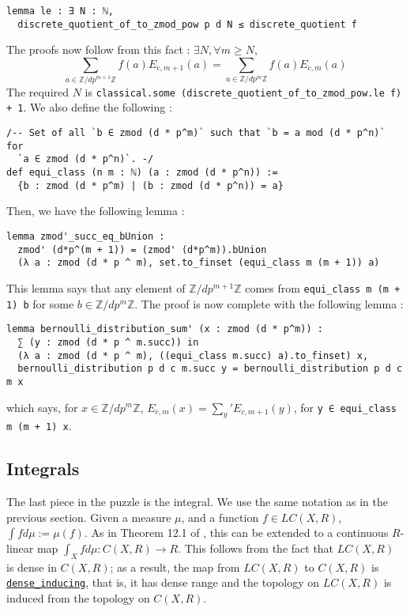 \documentclass[a4paper,UKenglish,cleveref, autoref, thm-restate,pdfa]{lipics-v2021}
\newcommand{\lean}[1]{\texttt{#1}\xspace} %
\begin{document}
\begin{lstlisting}
lemma le : ∃ N : ℕ, 
  discrete_quotient_of_to_zmod_pow p d N ≤ discrete_quotient f
\end{lstlisting} 
The proofs now follow from this fact : $\exists N, \forall m \ge N$,
$$ \sum_{a \in \mathbb{Z}/dp^{m + 1} \mathbb{Z}} f(a) E_{c,m + 1}(a) = \sum_{a \in \mathbb{Z}/dp^{m} \mathbb{Z}} f(a) E_{c,m}(a) $$
The required $N$ is \lean{classical.some (discrete\_quotient\_of\_to\_zmod\_pow.le f) + 1}. We also define the following : 
\begin{lstlisting}
/-- Set of all `b ∈ zmod (d * p^m)` such that `b = a mod (d * p^n)` for 
  `a ∈ zmod (d * p^n)`. -/
def equi_class (n m : ℕ) (a : zmod (d * p^n)) := 
  {b : zmod (d * p^m) | (b : zmod (d * p^n)) = a}
\end{lstlisting}
Then, we have the following lemma :
\begin{lstlisting}
lemma zmod'_succ_eq_bUnion : 
  zmod' (d*p^(m + 1)) = (zmod' (d*p^m)).bUnion
  (λ a : zmod (d * p ^ m), set.to_finset (equi_class m (m + 1)) a) 
\end{lstlisting}
This lemma says that any element of $\mathbb{Z}/dp^{m + 1} \mathbb{Z}$ comes from \lean{equi\_class m (m + 1) b} for some $b \in \mathbb{Z}/dp^m \mathbb{Z}$. 
The proof is now complete with the following lemma :
\begin{lstlisting}
lemma bernoulli_distribution_sum' (x : zmod (d * p^m)) : 
  ∑ (y : zmod (d * p ^ m.succ)) in 
  (λ a : zmod (d * p ^ m), ((equi_class m.succ) a).to_finset) x,
  bernoulli_distribution p d c m.succ y = bernoulli_distribution p d c m x 
\end{lstlisting}
which says, for $x \in \mathbb{Z}/dp^m \mathbb{Z}$, $E_{c, m} (x) = \sum_{y}' E_{c, m + 1} (y)$, for \lean{y ∈ equi\_class m (m + 1) x}. 

\subsection{Integrals}
The last piece in the puzzle is the integral. We use the same notation as in the previous
section. Given a measure $\mu$, and a function $f \in LC(X, R)$, $\int f d\mu := \mu(f)$. As in Theorem 12.1 of \cite{cyc}, this can be extended to a
continuous $R$-linear map $ \int_X f d\mu : C(X, R) \xrightarrow[]{} R $. 
This follows from the fact that $LC(X, R)$ is dense in $C(X, R)$; as a result, the map from 
$LC(X, R)$ to $C(X, R)$ is \href{https://leanprover-community.github.io/mathlib_docs/topology/dense_embedding.html#dense_inducing}{\lean{dense\_inducing}}, 
that is, it has dense range and the topology on $LC(X, R)$ is 
induced from the topology on $C(X,R)$. 
\end{document}

